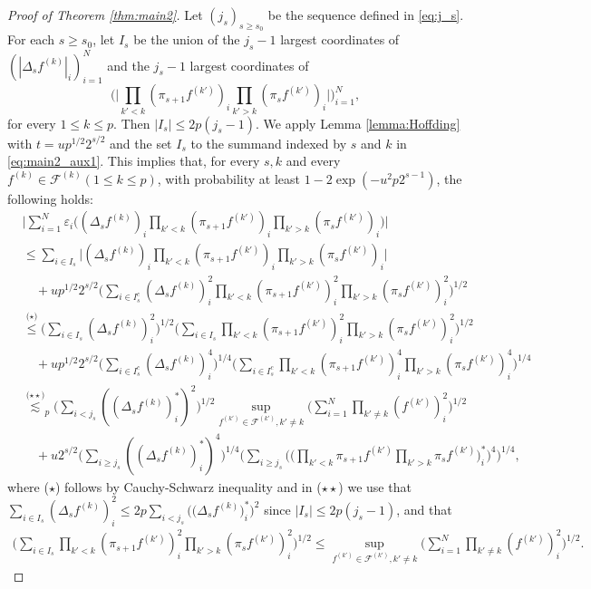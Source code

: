 \documentclass[numbers,webpdf,imaiai]{ima-authoring-template}
\theoremstyle{thmstyletwo}%
\numberwithin{equation}{section}
\numberwithin{equation}{section}
\newcommand{\F}{\mathcal{F}}
\begin{document}
\begin{proof}[Proof of Theorem \ref{thm:main2}]
Let $(j_{s})_{s\ge s_0}$ be the sequence defined in \eqref{eq:j_s}. For each $s\ge s_0$, let $I_s$ be the union of the $j_{s}-1$ largest coordinates of $(|\Delta_{s} f^{(k)}|_i)_{i=1}^N$ and the $j_{s}-1$ largest coordinates of 
\[
\bigg(\Big|\prod_{k'<k}(\pi_{s+1} f^{(k')})_{i}\prod_{k'>k}(\pi_{s} f^{(k')})_i\Big|\bigg)_{i=1}^{N},
\]
for every $1\le k\le p$. Then $|I_{s}|\le 2p(j_{s}-1)$. 
We apply Lemma \ref{lemma:Hoffding} with $t=u p^{1/2}2^{s/2}$ and the set $I_s$ to the summand indexed by $s$ and $k$ in \eqref{eq:main2_aux1}. This implies that, for every $s, k$ and every $f^{(k)}\in \F^{(k)} (1\le k\le p)$, with probability at least $1-2 \exp (-u^2 p 2^{s-1})$, the following holds:
\begin{align*}
 &\bigg| \sum_{i=1}^{N} \varepsilon_i \bigg((\Delta_{s}f^{(k)})_i\prod_{k'<k}(\pi_{s+1} f^{(k')})_{i}\prod_{k'>k}(\pi_{s} f^{(k')})_i\bigg) \bigg|\\
     &\le \sum_{i\in I_s}\bigg|(\Delta_{s}f^{(k)})_i\prod_{k'<k}(\pi_{s+1} f^{(k')})_{i}\prod_{k'>k}(\pi_{s} f^{(k')})_i\bigg|\\
     &\quad +u p^{1/2} 2^{s/2} \bigg(\sum_{i\in I_s^c} (\Delta_{s}f^{(k)})^2_i\prod_{k'<k}(\pi_{s+1} f^{(k')})^2_{i}\prod_{k'>k}(\pi_{s} f^{(k')})^2_i \bigg)^{1/2}\\
     &\overset{\text{($\star$)}}{\le} \bigg(\sum_{i\in I_s} (\Delta_s f^{(k)})^2_i\bigg)^{1/2} \bigg(\sum_{i\in I_s} \prod_{k'<k}(\pi_{s+1} f^{(k')})^2_{i}\prod_{k'>k}(\pi_{s} f^{(k')})^2_i\bigg)^{1/2}\\
     &\quad +u p^{1/2} 2^{s/2}\bigg(\sum_{i\in I^c_s} (\Delta_s f^{(k)})^4_i\bigg)^{1/4} \bigg(\sum_{i\in I^c_s} \prod_{k'<k}(\pi_{s+1} f^{(k')})^4_{i}\prod_{k'>k}(\pi_{s} f^{(k')})^4_i\bigg)^{1/4}\\
&\overset{\text{($\star \star$)}}{\lesssim}_p \bigg(\sum_{i<j_{s}}\left(\left(\Delta_{s} f^{(k)}\right)_i^*\right)^2\bigg)^{1 / 2} \sup_{f^{(k')}\in \F^{(k')},k'\ne k}\bigg(\sum_{i=1}^{N} \prod_{k'\ne k} (f^{(k')})^2_{i}\bigg)^{1/2}\\
&\quad+u 2^{s/2}\bigg(\sum_{i\ge j_{s}}\left(\left(\Delta_{s} f^{(k)}\right)_i^*\right)^4\bigg)^{1 / 4}\Bigg( \sum_{i\ge j_s}  \bigg(\bigg( \prod_{k'<k}\pi_{s+1} f^{(k')}\prod_{k'>k}\pi_{s} f^{(k')} \bigg)^*_{i}\bigg)^4\Bigg)^{1/4},
\end{align*}
where ($\star$) follows by Cauchy-Schwarz inequality and in ($\star\star$) we use that $ \sum_{i\in I_s} (\Delta_s f^{(k)})^2_i\le 2p \sum_{i<j_s} \big(\big(\Delta_s f^{(k)}\big)^*_i \big)^2 $ since $|I_{s}|\le 2p(j_s-1)$, and that
\begin{align*}
 \bigg(\sum_{i\in I_s} \prod_{k'<k}(\pi_{s+1} f^{(k')})^2_{i}\prod_{k'>k}(\pi_{s} f^{(k')})^2_i\bigg)^{1/2}\le \sup_{f^{(k')}\in \F^{(k')},k'\ne k}\bigg(\sum_{i=1}^{N} \prod_{k'\ne k} (f^{(k')})^2_{i}\bigg)^{1/2}.
\end{align*}


\end{proof}
\end{document}
